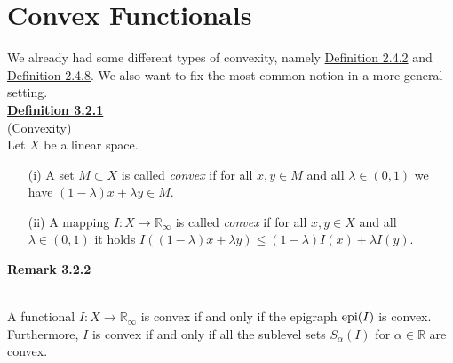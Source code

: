         \section{Convex Functionals}
We already had some different types of convexity, namely \hyperlink{definition_2_4_2}{Definition 2.4.2} and \hyperlink{definition_2_4_8}{Definition 2.4.8}. We also want to fix the most common notion in a more general setting.\\[11pt]

\textbf{\underline{Definition 3.2.1}}\\
(Convexity)\\
Let $X$ be a linear space.
\begin{itemize}
	\item[(i)] A set $M\subset X$ is called \textit{convex} if for all $x,y\in M$ and all $\lambda\in(0,1)$ we have $(1-\lambda)x+\lambda y\in M$.
	\item[(ii)] A mapping $I:X\longrightarrow\mathbb{R}_\infty$ is called \textit{convex} if for all $x,y\in X$ and all $\lambda\in(0,1)$ it holds $I((1-\lambda)x+\lambda y)\leq(1-\lambda)I(x)+\lambda I(y)$.\\[11pt]
\end{itemize}

\hypertarget{remark_3_2_2}{\textbf{Remark 3.2.2}}\\
A functional $I:X\longrightarrow\mathbb{R}_\infty$ is convex if and only if the epigraph $\operatorname{epi}\mathopen{}\left(I\right)\mathclose{}$ is convex. Furthermore, $I$ is convex if and only if all the sublevel sets $S_\alpha(I)$ for $\alpha\in\mathbb{R}$ are convex.\\[11pt]

